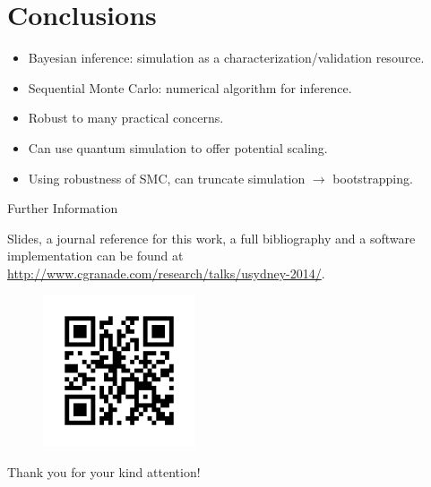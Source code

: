 \documentclass[xcolor=dvipsnames, compress]{beamer}
\begin{document}
\section{Conclusions}

\begin{frame}{}

  \begin{itemize}
   \item<+-> Bayesian inference: simulation as a characterization/validation resource.
   \item<+-> Sequential Monte Carlo: numerical algorithm for inference.
   \item<+-> Robust to many practical concerns.
   \item<+-> Can use quantum simulation to offer potential scaling.
   \item<+-> Using robustness of SMC, can truncate simulation $\to$ bootstrapping.
  \end{itemize}

\end{frame}

\begin{frame}{Further Information}

  Slides, a journal reference for this work, a full bibliography and a software implementation can
  be found at \url{http://www.cgranade.com/research/talks/usydney-2014/}.

  \begin{figure}
     \includegraphics[width=0.4\textwidth]{figures/link}
  \end{figure}

  \begin{block}{}
    Thank you for your kind attention!
  \end{block}
\end{frame}


\appendix 
\end{document}
